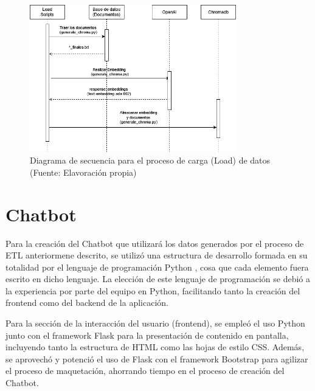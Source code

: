 \begin{figure}[ht!]
    \centering
    \includegraphics[width=0.8\textwidth]{figures/load_diagram.png}
    \caption[Diagrama de secuencia para el proceso de carga (Load) de datos]{Diagrama de secuencia para el proceso de carga (Load)  de datos\\
    {\scriptsize (Fuente: Elavoración propia)}}
    \label{fig:load_diagram}
\end{figure}

\newpage



\section{Chatbot}

   
Para la creación del Chatbot que utilizará los datos generados por el proceso de ETL anteriormene descrito, se utilizó
una estructura de desarrollo formada en su totalidad por el lenguaje de programación Python \cite{pythonWelcomePythonorg}, cosa que cada elemento fuera escrito en dicho lenguaje. 
La elección de este lenguaje de programación se debió a la experiencia por parte del equipo en Python, facilitando tanto la creación del frontend como del backend de la aplicación.

Para la sección de la interacción del usuario (frontend), se empleó el uso Python junto con el framework Flask \cite{flask1} para la presentación  
de contenido en pantalla, incluyendo tanto la estructura de HTML como las hojas de estilo CSS. Además, se aprovechó y potenció el uso de Flask con el  
framework Bootstrap para agilizar el proceso de maquetación, ahorrando tiempo en el proceso de creación del Chatbot.

